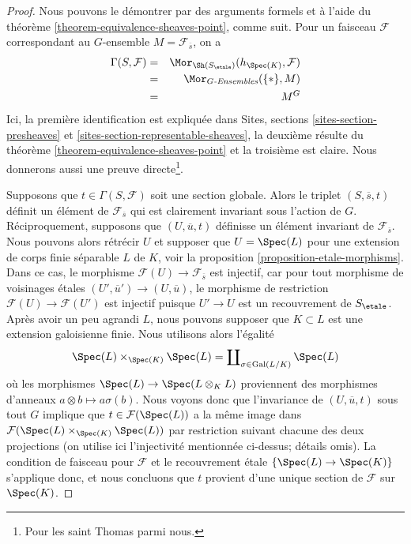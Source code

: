 \begin{proof}
Nous pouvons le d\'emontrer par des arguments formels et \`a l'aide du
th\'eor\`eme \ref{theorem-equivalence-sheaves-point},
comme suit. Pour un faisceau $\mathcal{F}$ correspondant au
$G$-ensemble $M = \mathcal{F}_{\overline{s}}$, on a
\begin{eqnarray*}
\Gamma(S, \mathcal{F}) & = &
\Mor_{\Sh(S_\etale)}(h_{\Spec(K)},  \mathcal{F})
\\
& = & \Mor_{G\textit{-Ensembles}}(\{*\}, M) \\
& = & M^G
\end{eqnarray*}
Ici, la premi\`ere identification est expliqu\'ee dans
Sites, sections \ref{sites-section-presheaves} et
\ref{sites-section-representable-sheaves},
la deuxi\`eme r\'esulte du
th\'eor\`eme \ref{theorem-equivalence-sheaves-point}
et la troisi\`eme est claire. Nous donnerons aussi une preuve directe\footnote{Pour
les saint Thomas parmi nous.}.

\medskip\noindent
Supposons que $t \in \Gamma(S, \mathcal{F})$ soit une section globale.
Alors le triplet $(S, \overline{s}, t)$ d\'efinit un \'el\'ement de
$\mathcal{F}_{\overline{s}}$ qui est clairement invariant sous
l'action de $G$. R\'eciproquement, supposons que $(U, \overline{u}, t)$
d\'efinisse un \'el\'ement invariant de $\mathcal{F}_{\overline{s}}$.
Nous pouvons alors r\'etr\'ecir $U$ et supposer que $U = \Spec(L)$ pour une
extension de corps finie s\'eparable $L$ de $K$, voir la
proposition \ref{proposition-etale-morphisms}.
Dans ce cas, le morphisme $\mathcal{F}(U) \to \mathcal{F}_{\overline{s}}$
est injectif, car pour tout morphisme de voisinages \'etales
$(U', \overline{u}') \to (U, \overline{u})$, le morphisme de restriction
$\mathcal{F}(U) \to \mathcal{F}(U')$ est injectif puisque $U' \to U$
est un recouvrement de $S_\etale$.
Apr\`es avoir un peu agrandi $L$, nous pouvons supposer que $K \subset L$ est une extension
galoisienne finie. Nous utilisons alors l'\'egalit\'e
$$
\Spec(L) \times_{\Spec(K)} \Spec(L)
=
\coprod\nolimits_{\sigma \in \text{Gal}(L/K)} \Spec(L)
$$
o\`u les morphismes $\Spec(L) \to \Spec(L \otimes_K L)$
proviennent des morphismes d'anneaux $a \otimes b \mapsto a\sigma(b)$. Nous
voyons donc que l'invariance de $(U, \overline{u}, t)$
sous tout $G$ implique que $t \in \mathcal{F}(\Spec(L))$
a la m\^eme image dans
$\mathcal{F}(\Spec(L) \times_{\Spec(K)} \Spec(L))$
par restriction suivant chacune des deux projections (on utilise ici l'injectivit\'e mentionn\'ee
ci-dessus; d\'etails omis). La condition de faisceau pour $\mathcal{F}$
et le recouvrement \'etale $\{\Spec(L) \to \Spec(K)\}$ s'applique
donc, et nous concluons que $t$ provient d'une unique section de $\mathcal{F}$
sur $\Spec(K)$.
\end{proof}

